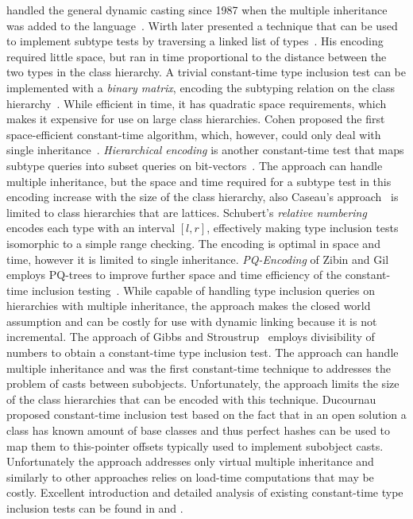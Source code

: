 \Cpp{} handled the general dynamic casting since 1987 when the multiple inheritance 
was added to the language~\cite{Str87}. Wirth later presented a technique that 
can be used to implement subtype tests by traversing a linked list of 
types~\cite{Wirth88}. His encoding required little space, but ran in time 
proportional to the distance between the two types in the class hierarchy. 
A trivial constant-time type inclusion test can be implemented with a 
\emph{binary matrix}, encoding the subtyping relation on the class 
hierarchy~\cite{Vortex96}. While efficient in time, it has quadratic space 
requirements, which makes it expensive for use on large class hierarchies. Cohen 
proposed the first space-efficient constant-time algorithm, which, however, could 
only deal with single inheritance~\cite{Cohen91}. \emph{Hierarchical encoding} 
is another constant-time test that maps subtype queries into subset queries on 
bit-vectors~\cite{Caseau93,Krall97nearoptimal}. The approach can handle multiple
inheritance, but the space and time required for a subtype test in this encoding 
increase with the size of the class hierarchy, also Caseau's approach~\cite{Caseau93} is 
limited to class hierarchies that are lattices. Schubert's \emph{relative 
numbering}~\cite{Schubert83} encodes each type with an interval $[l,r]$, 
effectively making type inclusion tests isomorphic to a simple range checking. 
The encoding is optimal in space and time, however it is limited to single 
inheritance. \emph{PQ-Encoding} of Zibin and Gil employs PQ-trees to improve 
further space and time efficiency of the constant-time inclusion 
testing~\cite{PQEncoding}. While capable of handling type inclusion queries on 
hierarchies with multiple inheritance, the approach makes the closed world assumption and can be costly 
for use with dynamic linking because it is not incremental.
The approach of Gibbs and Stroustrup~\cite{FastDynCast} employs divisibility of 
numbers to obtain a constant-time type inclusion test. The approach can handle 
multiple inheritance and was the first constant-time technique to addresses the 
problem of casts between subobjects. Unfortunately, the approach limits the size 
of the class hierarchies that can be encoded with this technique. 
Ducournau proposed constant-time inclusion test based on the fact that in an 
open solution a class has known amount of base classes and thus perfect hashes 
can be used to map them to this-pointer offsets typically used to implement 
subobject casts\cite{Ducournau08}. Unfortunately the approach addresses only 
virtual multiple inheritance and similarly to other approaches relies on 
load-time computations that may be costly. Excellent introduction and detailed 
analysis of existing constant-time type inclusion tests can be found in 
\cite{Vitek97} and \cite{PQEncoding}.

